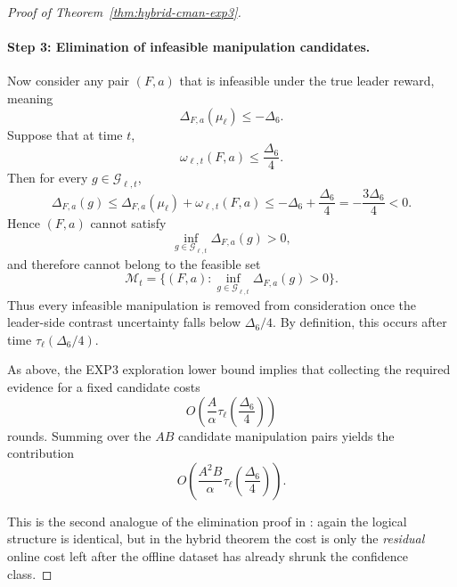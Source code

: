 \documentclass{article}
\begin{document}
\begin{proof}[Proof of Theorem~\ref{thm:hybrid-cman-exp3}]
\paragraph{Step 3: Elimination of infeasible manipulation candidates.}
Now consider any pair $(F,a)$ that is infeasible under the true leader
reward, meaning
\[
\Delta_{F,a}(\mu_\ell)\le -\Delta_6.
\]
Suppose that at time $t$,
\[
\omega_{\ell,t}(F,a)\le \frac{\Delta_6}{4}.
\]
Then for every $g\in\mathcal G_{\ell,t}$,
\[
\Delta_{F,a}(g)
\le
\Delta_{F,a}(\mu_\ell)+\omega_{\ell,t}(F,a)
\le
-\Delta_6+\frac{\Delta_6}{4}
=
-\frac{3\Delta_6}{4}
<0.
\]
Hence $(F,a)$ cannot satisfy
\[
\inf_{g\in\mathcal G_{\ell,t}}\Delta_{F,a}(g)>0,
\]
and therefore cannot belong to the feasible set
\[
\mathcal M_t
=
\{(F,a):\inf_{g\in\mathcal G_{\ell,t}}\Delta_{F,a}(g)>0\}.
\]
Thus every infeasible manipulation is removed from consideration once
the leader-side contrast uncertainty falls below $\Delta_6/4$. By
definition, this occurs after time $\tau_\ell(\Delta_6/4)$.

As above, the EXP3 exploration lower bound implies that collecting the
required evidence for a fixed candidate costs
\[
O\!\left(
\frac{A}{\alpha}\tau_\ell\!\left(\frac{\Delta_6}{4}\right)
\right)
\]
rounds. Summing over the $AB$ candidate manipulation pairs yields the
contribution
\[
O\!\left(
\frac{A^2B}{\alpha}\tau_\ell\!\left(\frac{\Delta_6}{4}\right)
\right).
\]

This is the second analogue of the elimination proof in
\cite{yu2024decentralized}: again the logical structure is identical,
but in the hybrid theorem the cost is only the \emph{residual} online
cost left after the offline dataset has already shrunk the confidence
class.


\end{proof}
\end{document}
